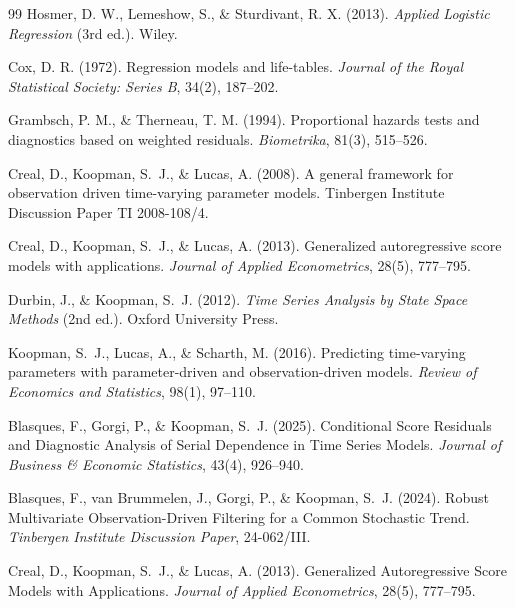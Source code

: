 \documentclass[11pt,a4paper]{article}
\begin{document}
\begin{thebibliography}{99}
Hosmer, D. W., Lemeshow, S., \& Sturdivant, R. X. (2013).
\newblock \textit{Applied Logistic Regression} (3rd ed.). Wiley.

Cox, D. R. (1972).
\newblock Regression models and life-tables.
\newblock \textit{Journal of the Royal Statistical Society: Series B}, 34(2), 187--202.

Grambsch, P. M., \& Therneau, T. M. (1994).
\newblock Proportional hazards tests and diagnostics based on weighted residuals.
\newblock \textit{Biometrika}, 81(3), 515--526.


Creal, D., Koopman, S.~J., \& Lucas, A. (2008).
\newblock A general framework for observation driven time-varying parameter models.
\newblock Tinbergen Institute Discussion Paper TI 2008-108/4.

Creal, D., Koopman, S.~J., \& Lucas, A. (2013).
\newblock Generalized autoregressive score models with applications.
\newblock \textit{Journal of Applied Econometrics}, 28(5), 777--795.

Durbin, J., \& Koopman, S.~J. (2012).
\newblock \textit{Time Series Analysis by State Space Methods} (2nd ed.).
\newblock Oxford University Press.

Koopman, S.~J., Lucas, A., \& Scharth, M. (2016).
\newblock Predicting time-varying parameters with parameter-driven and observation-driven models.
\newblock \textit{Review of Economics and Statistics}, 98(1), 97--110.


Blasques, F., Gorgi, P., \& Koopman, S.~J. (2025).
\newblock Conditional Score Residuals and Diagnostic Analysis of Serial Dependence in Time Series Models.
\newblock \emph{Journal of Business \& Economic Statistics}, 43(4), 926--940.

Blasques, F., van Brummelen, J., Gorgi, P., \& Koopman, S.~J. (2024).
\newblock Robust Multivariate Observation-Driven Filtering for a Common Stochastic Trend.
\newblock \emph{Tinbergen Institute Discussion Paper}, 24-062/III.

Creal, D., Koopman, S.~J., \& Lucas, A. (2013).
\newblock Generalized Autoregressive Score Models with Applications.
\newblock \emph{Journal of Applied Econometrics}, 28(5), 777--795.


\end{thebibliography}
\end{document}
